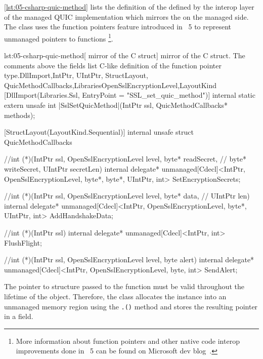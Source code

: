 \autoref{lst:05-csharp-quic-method} lists the definition of the  defined
by the interop layer of the managed QUIC implementation which mirrors the 
on the managed \dotnet{} side. The  class uses the \csharp{} function
pointers feature introduced in \dotnet{}~5 to represent unmanaged pointers to \csharp{} functions
\footnote{More information about \csharp{} function pointers and other native code interop
  improvements done in \dotnet{}~5 can be found on Microsoft dev
  blog~\cite{dotnet5interopimprovements}.}.

\begin{myListingCsharpNoPageBreak}{lst:05-csharp-quic-method}{[\csharp{} mirror of the  C struct]\csharp{} mirror of the  C struct. The comments above the fields list C-like definition of the function pointer type.}{DllImport,IntPtr, UIntPtr, StructLayout, QuicMethodCallbacks,Libraries}{OpenSslEncryptionLevel,LayoutKind}
[DllImport(Libraries.Ssl, EntryPoint = "SSL_set_quic_method")]
internal static extern unsafe int |SslSetQuicMethod|(IntPtr ssl,
    QuicMethodCallbacks* methods);

[StructLayout(LayoutKind.Sequential)]
internal unsafe struct QuicMethodCallbacks
{
    //int (*)(IntPtr ssl, OpenSslEncryptionLevel level, byte* readSecret,
    //        byte* writeSecret, UIntPtr secretLen)
    internal delegate* unmanaged[Cdecl]<IntPtr, OpenSslEncryptionLevel,
        byte*, byte*, UIntPtr, int> SetEncryptionSecrets;

    //int (*)(IntPtr ssl, OpenSslEncryptionLevel level, byte* data,
    //        UIntPtr len)
    internal delegate* unmanaged[Cdecl]<IntPtr, OpenSslEncryptionLevel,
        byte*, UIntPtr, int> AddHandshakeData;

    //int (*)(IntPtr ssl)
    internal delegate* unmanaged[Cdecl]<IntPtr, int> FlushFlight;

    //int (*)(IntPtr ssl, OpenSslEncryptionLevel level, byte alert)
    internal delegate* unmanaged[Cdecl]<IntPtr, OpenSslEncryptionLevel, byte,
        int> SendAlert;
}
\end{myListingCsharpNoPageBreak}

The pointer to  structure passed to the 
function must be valid throughout the lifetime of the \SSLCTX{} object. Therefore, the \OpenSslTls{}
class allocates the  instance into an unmanaged memory region using the
\texttt{.()} method and stores the resulting pointer in a
 field.

